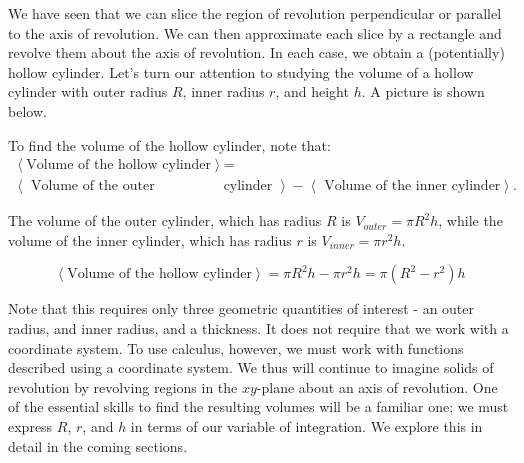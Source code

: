 \documentclass{ximera}
\begin{document}
We have seen that we can slice the region of revolution perpendicular or parallel to the axis of revolution.  We can then approximate each slice by a rectangle and revolve them about the axis of revolution.  In each case, we obtain a (potentially) hollow cylinder. Let's turn our attention to studying the volume of a hollow cylinder with outer radius $R$, inner radius $r$, and height $h$.  A picture is shown below.

\begin{image} %
\end{image}

To find the volume of the hollow cylinder, note that:
\begin{align*}
\left< \textrm{Volume of the hollow cylinder} \right>  &=   \\
 \left< \textrm{ Volume of the outer } \right. & \left. \textrm{cylinder } \right> - \left< \textrm{ Volume of the inner cylinder} \right>.
\end{align*}
 
 The volume of the outer cylinder, which has radius $R$ is $V_{outer} = \pi R^2 h$, while the volume of the inner cylinder, which has radius $r$ is $V_{inner} = \pi r^2 h$.  
 
\[
\left< \textrm{Volume of the hollow cylinder} \right> = \pi R^2h-\pi r^2h=\pi(R^2-r^2)h 
\]

Note that this requires only three geometric quantities of interest - an outer radius, and inner radius, and a thickness.  It does not require that we work with a coordinate system.  To use calculus, however, we must work with functions described using a coordinate system.  We thus will continue to imagine solids of revolution by revolving regions in the $xy$-plane about an axis of revolution.  One of the essential skills to find the resulting volumes will be a familiar one; we must express $R$, $r$, and $h$ in terms of our variable of integration.  We explore this in detail in the coming sections.
\end{document}
